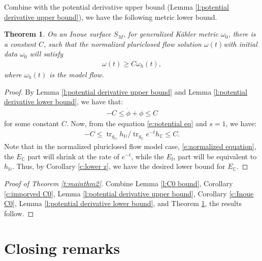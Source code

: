 \documentclass[12pt]{amsart}
\numberwithin{equation}{section}
\newtheorem{thm}[prop]{Theorem}
\numberwithin{prop}{section}
\theoremstyle{definition}
\newcommand{\gw}{\omega}
\begin{document}
Combine with the potential derivative upper bound (Lemma \ref{l:potential derivative upper bound}), we have the following metric lower bound.
\begin{thm}\label{t:Inoue metric lower bound}
    On an Inoue surface $S_M$, for generalized K\"ahler metric $\omega_0$, there is a constant $C$, such that the normalized pluriclosed flow solution $\omega(t)$with initial data $\gw_0$ will satisfy
    \begin{align*}
        \omega(t)\geq C\omega_h(t),
    \end{align*}
    where $\omega_h(t)$ is the model flow.
\end{thm}
\begin{proof}
    By Lemma \ref{l:potential derivative upper bound} and Lemma \ref{l:potential derivative lower bound}, we have that:
    \begin{align*}
        -C\leq\dot{\phi} +\phi \leq C
    \end{align*}
    for some constant $C$. Now, from the equation \eqref{e:potential eq} and $s=1$, we have:
    \begin{align*}
        -C\leq \operatorname{tr}_{g_\mathbb{H}}h_\mathbb{H}/\operatorname{tr}_{g_\mathbb{C}}e^{-t}h_\mathbb{C}\leq C.
    \end{align*}
     Note that in the normalized pluriclosed flow model case, \eqref{e:normalized equation}, the $E_\mathbb{C}$ part will shrink at the rate of $e^{-t}$, while the $E_\mathbb{H}$ part will be equivalent to $h_\mathbb{H}$. Thus, by Corollary \ref{c:lower z}, we have the desired lower bound for $E_\mathbb{C}$.
\end{proof}
\begin{proof} [Proof of Theorem \ref{t:mainthm2}]
Combine Lemma \ref{l:C0 bound}, Corollary \ref{c:imporved C0}, Lemma \ref{l:potential derivative upper bound}, Corollary \ref{c:Inoue C0}, Lemma \ref{l:potential derivative lower bound}, and Theorem \ref{t:Inoue metric lower bound}, the results follow.
\end{proof}

%
%
%
%
\section{Closing remarks}
%
%
%
%
\end{document}
